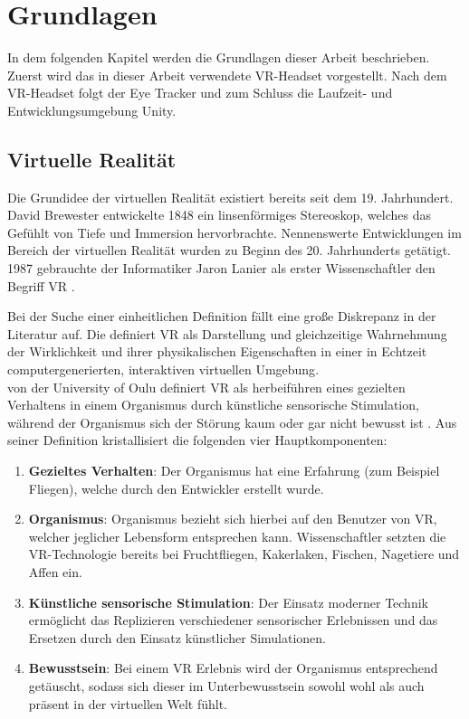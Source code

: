 
\chapter{Grundlagen}
In dem folgenden Kapitel werden die Grundlagen dieser Arbeit beschrieben. Zuerst wird das in dieser Arbeit verwendete \acs{VR}-Headset vorgestellt. Nach dem \acs{VR}-Headset folgt der Eye Tracker und zum Schluss die Laufzeit- und Entwicklungsumgebung Unity.

\section{Virtuelle Realität}
Die Grundidee der virtuellen Realität existiert bereits seit dem 19. Jahrhundert. David Brewester entwickelte 1848 ein linsenförmiges Stereoskop, welches das Gefühlt von Tiefe und Immersion hervorbrachte. Nennenswerte Entwicklungen im Bereich der virtuellen Realität wurden zu Beginn des 20. Jahrhunderts getätigt. \cite[S. 1f]{Singh.2017} 1987 gebrauchte der Informatiker Jaron Lanier als erster Wissenschaftler den Begriff \ac{VR} \cite{Doerner2019}. 

Bei der Suche einer einheitlichen Definition fällt eine große Diskrepanz in der Literatur auf. Die \citeauthor{BundeszentralefurpolitischeBildung.2018} definiert \ac{VR} als \glqq Darstellung und gleichzeitige Wahrnehmung der Wirklichkeit und ihrer physikalischen Eigenschaften in einer in Echtzeit computergenerierten, interaktiven virtuellen Umgebung\grqq  \cite{BundeszentralefurpolitischeBildung.2018}. \\
\citeauthor{LaValle.2019} von der University of Oulu definiert \ac{VR} als herbeiführen eines gezielten Verhaltens in einem Organismus durch künstliche sensorische Stimulation, während der Organismus sich der Störung kaum oder gar nicht bewusst ist \cite[S. 1]{LaValle.2019}. Aus seiner Definition kristallisiert \citeauthor{LaValle.2019} die folgenden vier Hauptkomponenten:\cite[S. 1,3]{LaValle.2019} 
\begin{enumerate}
	\item \textbf{Gezieltes Verhalten}: Der Organismus hat eine Erfahrung (zum Beispiel Fliegen), welche durch den Entwickler erstellt wurde. 
	\item \textbf{Organismus}: Organismus bezieht sich hierbei auf den Benutzer von \ac{VR}, welcher jeglicher Lebensform entsprechen kann. Wissenschaftler setzten die \ac{VR}-Technologie bereits bei Fruchtfliegen, Kakerlaken, Fischen, Nagetiere und Affen ein. 
	\item \textbf{Künstliche sensorische Stimulation}: Der Einsatz moderner Technik ermöglicht das Replizieren verschiedener sensorischer Erlebnissen und das Ersetzen durch den Einsatz künstlicher Simulationen. 
	\item \textbf{Bewusstsein}: Bei einem \acl{VR} Erlebnis wird der Organismus entsprechend getäuscht, sodass sich dieser im Unterbewusstsein sowohl wohl als auch präsent in der virtuellen Welt fühlt.
\end{enumerate}

